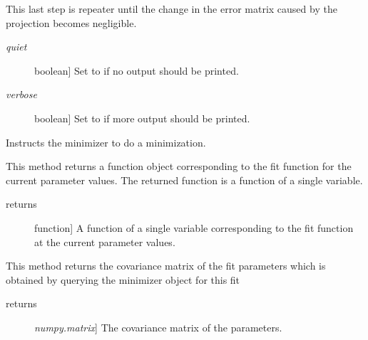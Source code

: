 \documentclass[letterpaper,10pt,english]{sphinxmanual}
\begin{document}
\begin{fulllineitems}
\begin{fulllineitems}
This last step is repeater until the change in the error matrix caused by the projection
becomes negligible.
\begin{description}
\item[{\emph{quiet}}] \leavevmode{[}boolean{]}
Set to  if no output should be printed.

\item[{\emph{verbose}}] \leavevmode{[}boolean{]}
Set to  if more output should be printed.

\end{description}

\end{fulllineitems}


\begin{fulllineitems}
\label{api/kafe:kafe.fit.Fit.fit_one_iteration}
Instructs the minimizer to do a minimization.

\end{fulllineitems}


\begin{fulllineitems}
\label{api/kafe:kafe.fit.Fit.get_current_fit_function}
This method returns a function object corresponding to the fit function
for the current parameter values. The returned function is a function of
a single variable.
\begin{description}
\item[{returns}] \leavevmode{[}function{]}
A function of a single variable corresponding to the fit function at the
current parameter values.

\end{description}

\end{fulllineitems}


\begin{fulllineitems}
\label{api/kafe:kafe.fit.Fit.get_error_matrix}
This method returns the covariance matrix of the fit parameters which is obtained
by querying the minimizer object for this fit
\begin{description}
\item[{returns}] \leavevmode{[}\emph{numpy.matrix}{]}
The covariance matrix of the parameters.


\end{description}
\end{fulllineitems}
\end{fulllineitems}
\end{document}
